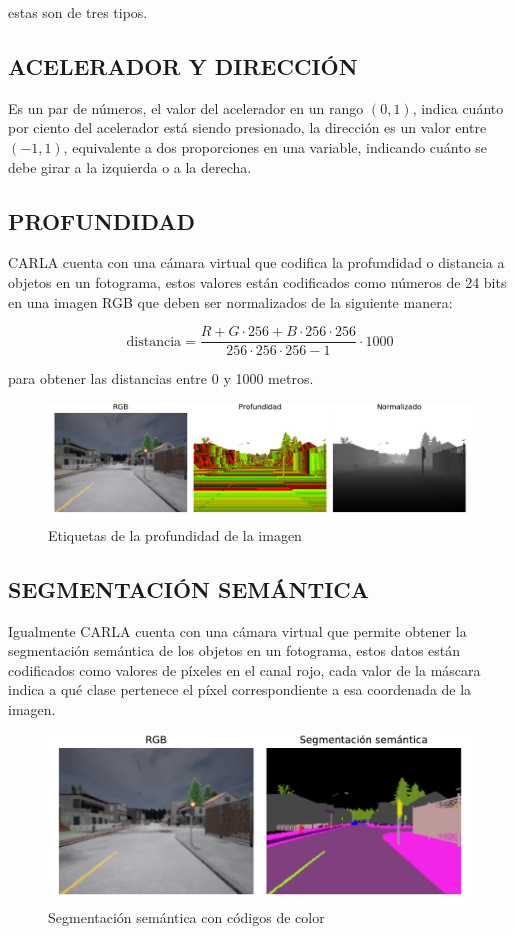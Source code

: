 estas son de tres tipos.

\subsection{ACELERADOR Y DIRECCIÓN}
Es un par de números, el valor del acelerador en un rango $(0, 1)$, indica cuánto por ciento del acelerador está siendo presionado, la dirección es un valor entre $(-1, 1)$, equivalente a dos proporciones en una variable, indicando cuánto se debe girar a la izquierda o a la derecha.

\subsection{PROFUNDIDAD}
CARLA cuenta con una cámara virtual que codifica la profundidad o distancia a objetos en un fotograma, estos valores están codificados como números de 24 bits en una imagen RGB que deben ser normalizados de la siguiente manera:

$$\text{distancia} = \frac{R + G\cdot256 + B\cdot256\cdot256}{256\cdot256\cdot256 - 1} \cdot 1000$$

para obtener las distancias entre 0 y 1000 metros.

\begin{figure}[H]
	\centering
	\includegraphics[scale=0.62]{imagenes/depth}
	\caption[Etiquetas de profundidad imagen]{Etiquetas de la profundidad de la imagen}
	\label{depth}
\end{figure}

\subsection{SEGMENTACIÓN SEMÁNTICA}
Igualmente CARLA cuenta con una cámara virtual que permite obtener la segmentación semántica de los objetos en un fotograma, estos datos están codificados como valores de píxeles en el canal rojo, cada valor de la máscara indica a qué clase pertenece el píxel correspondiente a esa coordenada de la imagen.

\begin{figure}[H]
	\centering
	\includegraphics[scale=0.55]{imagenes/semseg}
	\caption[Segmentación semántica con códigos de color]{Segmentación semántica con códigos de color}
	\label{semseg}
\end{figure}

